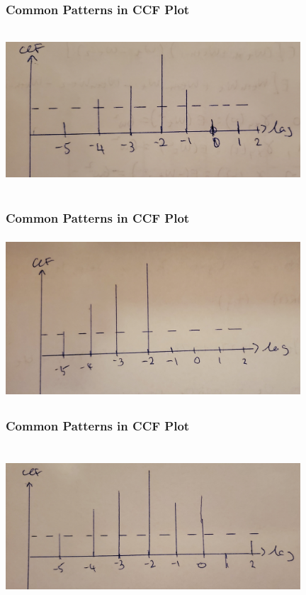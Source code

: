 \documentclass[%
xcolor=pdftex]{beamer}
\begin{document}
\begin{frame}
\frametitle{Common Patterns in CCF Plot}

\includegraphics[width=110mm, height=60mm]{slide23.jpg}

\end{frame}

\begin{frame}
\frametitle{Common Patterns in CCF Plot}

\includegraphics[width=110mm, height=60mm]{slide24.jpg}

\end{frame}

\begin{frame}
\frametitle{Common Patterns in CCF Plot}

\includegraphics[width=110mm, height=60mm]{slide25.jpg}

\end{frame}
\end{document}
